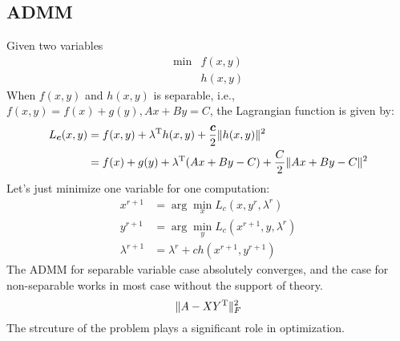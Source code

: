 \subsection{ADMM}
Given two variables
\[
\begin{array}{ll}
\min&f(x,y)\\
&h(x,y)
\end{array}
\]
When $f(x,y)$ and $h(x,y)$ is separable, i.e., $f(x,y)=f(x)+g(y), Ax+By=C$, the Lagrangian function is given by:
\begin{align*}
L_{\bm c}(x,y) &= f(x,y)+\lambda^{\mathrm T} h(x,y)+\frac{\bm c}{2}\|h(x,y)\|^2\\
&=f(x)+g(y)+\lambda^{\mathrm T} (Ax+By-C)+\frac{C}{2}\|Ax+By-C\|^2
\end{align*}
Let's just minimize one variable for one computation:
\begin{align*}
x^{r+1}&=\arg\min_xL_c(x,y^r,\lambda^r)\\
y^{r+1}&=\arg\min_yL_c(x^{r+1},y,\lambda^r)\\
\lambda^{r+1}&=\lambda^r+ch(x^{r+1},y^{r+1})
\end{align*}
The ADMM for separable variable case absolutely converges, and the case for non-separable works in most case without the support of theory.
\[
\|A - XY^{\mathrm T}\|_F^2
\]
The strcuture of the problem plays a significant role in optimization.










